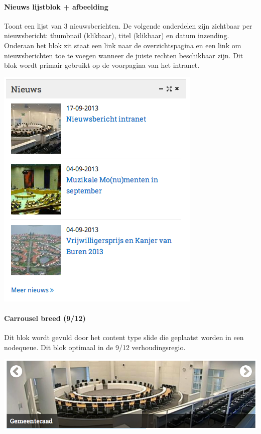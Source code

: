 \paragraph{Nieuws lijstblok + afbeelding}

Toont een lijst van 3 nieuwsberichten. De volgende onderdelen zijn zichtbaar per nieuwsbericht: thumbnail (klikbaar), titel (klikbaar) en datum inzending. Onderaan het blok zit staat een link naar de overzichtspagina en een link om nieuwsberichten toe te voegen wanneer de juiste rechten beschikbaar zijn. Dit blok wordt primair gebruikt op de voorpagina van het intranet.

\begin{center}
	\includegraphics[scale=0.5]{img/blokken/nieuwsteaserimg.png}
\end{center}

\paragraph{Carrousel breed (9/12)}

Dit blok wordt gevuld door het content type slide die geplaatst worden in een nodequeue. Dit blok optimaal in de 9/12 verhoudingsregio.

\begin{center}
	\includegraphics[scale=0.5]{img/blokken/carrouselbreed.png}
\end{center}

